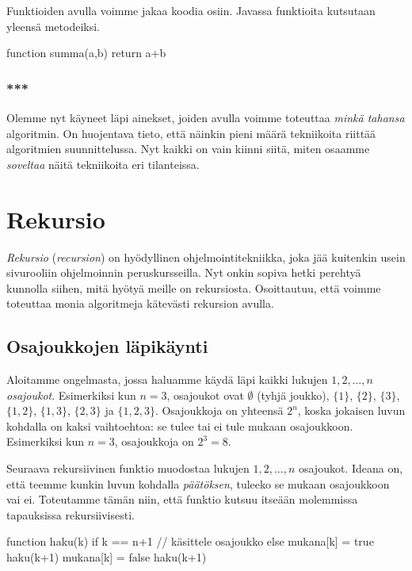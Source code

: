 Funktioiden avulla voimme jakaa koodia osiin.
Javassa funktioita kutsutaan yleensä metodeiksi.

\begin{code}
function summa(a,b)
    return a+b
\end{code}

\subsubsection{***}

Olemme nyt käyneet läpi ainekset,
joiden avulla voimme toteuttaa \emph{minkä tahansa} algoritmin.
On huojentava tieto, että näinkin pieni määrä tekniikoita
riittää algoritmien suunnittelussa.
Nyt kaikki on vain kiinni siitä, miten osaamme \emph{soveltaa}
näitä tekniikoita eri tilanteissa.

\section{Rekursio}


\emph{Rekursio} (\emph{recursion}) on hyödyllinen ohjelmointitekniikka,
joka jää kuitenkin usein sivurooliin ohjelmoinnin peruskursseilla.
Nyt onkin sopiva hetki perehtyä kunnolla siihen,
mitä hyötyä meille on rekursiosta.
Osoittautuu, että voimme toteuttaa monia algoritmeja
kätevästi rekursion avulla.

\subsection{Osajoukkojen läpikäynti}


Aloitamme ongelmasta, jossa haluamme käydä läpi
kaikki lukujen $1,2,\dots,n$ \emph{osajoukot}.
Esimerkiksi kun $n=3$, osajoukot ovat
$\emptyset$ (tyhjä joukko), $\{1\}$, $\{2\}$, $\{3\}$,
$\{1,2\}$, $\{1,3\}$, $\{2,3\}$ ja $\{1,2,3\}$.
Osajoukkoja on yhteensä $2^n$,
koska jokaisen luvun kohdalla on kaksi vaihtoehtoa:
se tulee tai ei tule mukaan osajoukkoon.
Esimerkiksi kun $n=3$, osajoukkoja on $2^3=8$.

Seuraava rekursiivinen funktio muodostaa lukujen
$1,2,\dots,n$ osajoukot.
Ideana on, että teemme kunkin luvun
kohdalla \emph{päätöksen}, tuleeko se mukaan osajoukkoon vai ei.
Toteutamme tämän niin,
että funktio kutsuu itseään molemmissa tapauksissa rekursiivisesti.

\begin{code}
function haku(k)
    if k == n+1
        // käsittele osajoukko
    else
        mukana[k] = true
        haku(k+1)
        mukana[k] = false
        haku(k+1)
\end{code}

